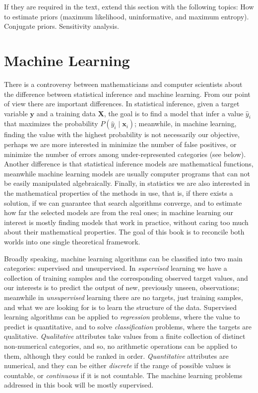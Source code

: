 {\color{red} If they are required in the text, extend this section with the following topics: How to estimate priors (maximum likelihood, uninformative, and maximum entropy). Conjugate priors. Sensitivity analysis.}

%
%

\section{Machine Learning}
\label{sec:machine_learning}

There is a controversy between mathematicians and computer scientists about the difference between statistical inference and machine learning. From our point of view there are important differences. In statistical inference, given a target variable $\mathbf{y}$ and a training data $\mathbf{X}$, the goal is to find a model that infer a value $\hat{y}_i$ that maximizes the probability $P(\hat{y}_i \mid \mathbf{x}_i)$; meanwhile, in machine learning, finding the value with the highest probability is not necessarily our objective, perhaps we are more interested in minimize the number of false positives, or minimize the number of errors among under-represented categories (see below). Another difference is that statistical inference models are mathematical functions, meanwhile machine learning models are usually computer programs that can not be easily manipulated algebraically. Finally, in statistics we are also interested in the mathematical properties of the methods in use, that is, if there exists a solution, if we can guarantee that search algorithms converge, and to estimate how far the selected models are from the real ones; in machine learning our interest is mostly finding models that work in practice, without caring too much about their mathematical properties. The goal of this book is to reconcile both worlds into one single theoretical framework.

Broadly speaking, machine learning algorithms can be classified into two main categories: supervised and unsupervised. In \emph{supervised} learning we have a collection of training samples and the corresponding observed target values, and our interests is to predict the output of new, previously unseen, observations; meanwhile in \emph{unsupervised} learning there are no targets, just training samples, and what we are looking for is to learn the structure of the data. Supervised learning algorithms can be applied to \emph{regression} problems, where the value to predict is quantitative, and to solve \emph{classification} problems, where the targets are qualitative. \emph{Qualitative} attributes take values from a finite collection of distinct non-numerical categories, and so, no arithmetic operations can be applied to them, although they could be ranked in order. \emph{Quantitative} attributes are numerical, and they can be either \emph{discrete} if the range of possible values is countable, or \emph{continuous} if it is not countable. The machine learning problems addressed in this book will be mostly supervised.

